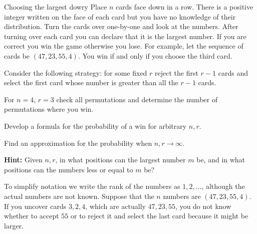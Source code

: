 \begin{prob}{Choosing the largest dowry}
Place $n$ cards face down in a row. There is a positive integer written on the face of each card but you have no knowledge of their distribution. Turn the cards over one-by-one and look at the numbers. After turning over each card you can declare that it is the largest number. If you are correct you win the game otherwise you lose. For example, let the sequence of cards be $(47, 23, 55, 4)$. You win if and only if you choose the third card.

Consider the following strategy: for some fixed $r$ reject the first $r-1$ cards and select the first card whose number is greater than all the $r-1$ cards.

 For $n=4$, $r=3$ check all permutations and determine the number of permutations where you win.

 Develop a formula for the probability of a win for arbitrary $n, r$.

 Find an approximation for the probability when $n,r\rightarrow \infty$.

\textbf{Hint:} Given $n,r$, in what positions can the largest number $m$ be, and in what positions can the numbers less or equal to $m$ be? 

\end{prob}

\solution{}

To simplify notation we write the rank of the numbers as $1,2,\ldots$, although the actual numbers are not known. Suppose that the $n$ numbers are $(47, 23, 55, 4)$. If you uncover cards $3,2,4$, which are actually $47,23,55$, you do not know whether to accept $55$ or to reject it and select the last card because it might be larger.

